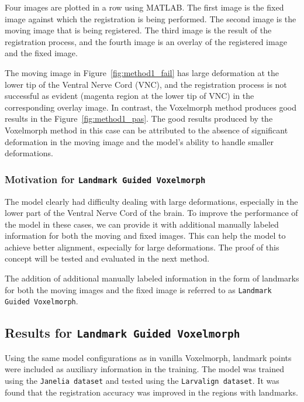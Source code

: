 \documentclass{book}
\begin{document}
	Four images are plotted in a row using MATLAB. The first image is the fixed image against which the registration is being performed. The second image is the moving image that is being registered. The third image is the result of the registration process, and the fourth image is an overlay of the registered image and the fixed image.
	
	The moving image in Figure~\ref{fig:method1_fail} has large deformation at the lower tip of the Ventral Nerve Cord (VNC), and the registration process is not successful as evident (magenta region at the lower tip of VNC) in the corresponding overlay image. In contrast, the Voxelmorph method produces good results in the Figure~\ref{fig:method1_pas}. The good results produced by the Voxelmorph method in this case can be attributed to the absence of significant deformation in the moving image and the model's ability to handle smaller deformations.

	
	\subsubsection{Motivation for \texttt{Landmark Guided Voxelmorph}} \label{subsec:motivation_for_method2}
	The model clearly had difficulty dealing with large deformations, especially in the lower part of the Ventral Nerve Cord of the brain. To improve the performance of the model in these cases, we can provide it with additional manually labeled information for both the moving and fixed images. This can help the model to achieve better alignment, especially for large deformations. The proof of this concept will be tested and evaluated in the next method.
	
	The addition of additional manually labeled information in the form of landmarks for both the moving images and the fixed image is referred to as \texttt{Landmark Guided Voxelmorph}.
	
	\subsection{Results for \texttt{Landmark Guided Voxelmorph}}
	Using the same model configurations as in vanilla Voxelmorph, landmark points were included as auxiliary information in the training. The model was trained using the \texttt{Janelia dataset} and tested using the \texttt{Larvalign dataset}. It was found that the registration accuracy was improved in the regions with landmarks.
	
\end{document}
